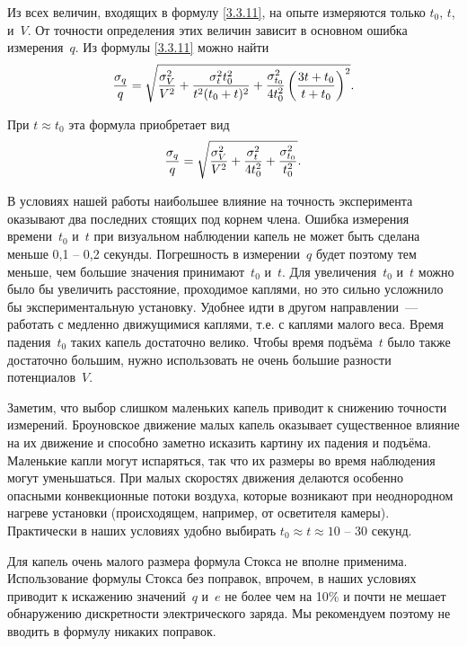 Из всех величин, входящих в формулу \eqref{3.3.11}, на опыте измеряются только
$t_0$, $t$, и~$V$. От точности определения этих величин зависит в основном
ошибка измерения~$q$. Из формулы \eqref{3.3.11} можно найти
\begin{equation}
	\frac{\sigma_q}{q}=\sqrt{\frac{\sigma^2_V}{V^2}+\frac{\sigma^2_t
t_0^2}{t^2(t_0+t)^2}+
	\frac{\sigma^2_{t_0}}{4t^2_0}\left(\frac{3t+t_0} {t+t_0}\right)^2}.
	\eqmark{3.3.12}
\end{equation}

При $t\approx t_0$ эта формула приобретает вид
\begin{equation}
	\frac{\sigma_q}{q}=\sqrt{\frac{\sigma^2_V}{V^2}+ \frac{\sigma^2_t}{4t^2_0}+
\frac{\sigma^2_{t_0}}{t^2_0}}.
	\eqmark{3.3.13}
\end{equation}

В условиях нашей работы наибольшее влияние на точность эксперимента оказывают
два последних стоящих под корнем члена. Ошибка измерения времени~$t_0$ и~$t$ при
визуальном наблюдении капель не может быть сделана меньше 0,1 -- 0,2 секунды.
Погрешность в измерении~$q$ будет поэтому тем меньше, чем большие значения
принимают~$t_0$ и~$t$. Для увеличения~$t_0$ и~$t$ можно было бы увеличить
расстояние, проходимое каплями, но это сильно усложнило бы экспериментальную
установку. Удобнее идти в другом направлении~--- работать с медленно движущимися
каплями, т.е. с каплями малого веса. Время падения~$t_0$ таких капель достаточно
велико. Чтобы время подъёма~$t$ было также достаточно большим, нужно
использовать не очень большие разности потенциалов~$V$.

Заметим, что выбор слишком маленьких капель приводит к снижению точности
измерений. Броуновское движение малых капель оказывает существенное влияние на
их движение и способно заметно исказить картину их падения и подъёма. Маленькие
капли могут испаряться, так что их размеры во время наблюдения могут
уменьшаться. При малых скоростях движения делаются особенно опасными
конвекционные потоки воздуха, которые возникают при неоднородном нагреве
установки (происходящем, например, от осветителя камеры). Практически в наших
условиях удобно выбирать $t_0\approx t\approx 10$ -- 30 секунд.

Для капель очень малого размера формула Стокса не вполне применима.
Использование формулы Стокса без поправок, впрочем, в наших условиях приводит к
искажению значений~$q$ и~$e$ не более чем на 10\% и почти не мешает обнаружению
дискретности электрического заряда. Мы рекомендуем поэтому не вводить в формулу
никаких поправок.

